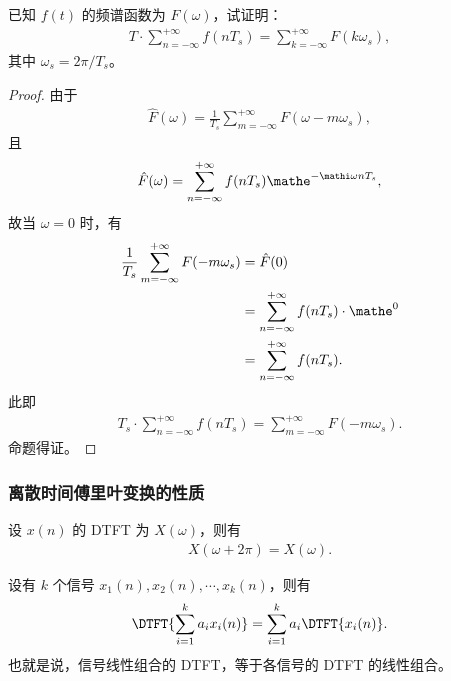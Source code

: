 \begin{exercise}
    已知 $f(t)$ 的频谱函数为 $F(\omega)$，试证明：
    \begin{align*}
        T \cdot \sum_{n = -\infty}^{+\infty}f(nT_s) = \sum_{k = -\infty}^{+\infty}F(k\omega_s),
    \end{align*}
    其中 $\omega_s = 2\pi / T_s$。
\end{exercise}

\begin{proof}
    由于
    \begin{align*}
        \hat{F}(\omega) = \frac{1}{T_s}\sum_{m = -\infty}^{+\infty}F(\omega - m\omega_s),
    \end{align*}
    且
    \begin{align*}
        \hat{F}(\omega) = \sum_{n = -\infty}^{+\infty}f(nT_s)\mathe^{-\mathi\omega nT_s},
    \end{align*}
    故当 $\omega = 0$ 时，有
    \begin{align*}
        \frac{1}{T_s}\sum_{m = -\infty}^{+\infty}F(-m\omega_s) & = \hat{F}(0) \\
        & = \sum_{n = -\infty}^{+\infty}f(nT_s) \cdot \mathe^{0} \\
        & = \sum_{n = -\infty}^{+\infty}f(nT_s).
    \end{align*}
    此即
    \begin{align*}
        T_s \cdot \sum_{n = -\infty}^{+\infty}f(nT_s) = \sum_{m = -\infty}^{+\infty}F(-m\omega_s).
    \end{align*}
    命题得证。
\end{proof}

\subsubsection{离散时间傅里叶变换的性质}

\begin{property}
    设 $x(n)$ 的 DTFT 为 $X(\omega)$，则有
    \begin{align*}
        X(\omega + 2\pi) = X(\omega).
    \end{align*}
\end{property}

\begin{property}
    设有 $k$ 个信号 $x_1(n), x_2(n), \cdots, x_k(n)$，则有
    \begin{align*}
        \DTFT{\sum_{i = 1}^{k}a_i x_i(n)} = \sum_{i = 1}^{k}a_i \DTFT{x_i(n)}.
    \end{align*}
    也就是说，信号线性组合的 DTFT，等于各信号的 DTFT 的线性组合。
\end{property}

